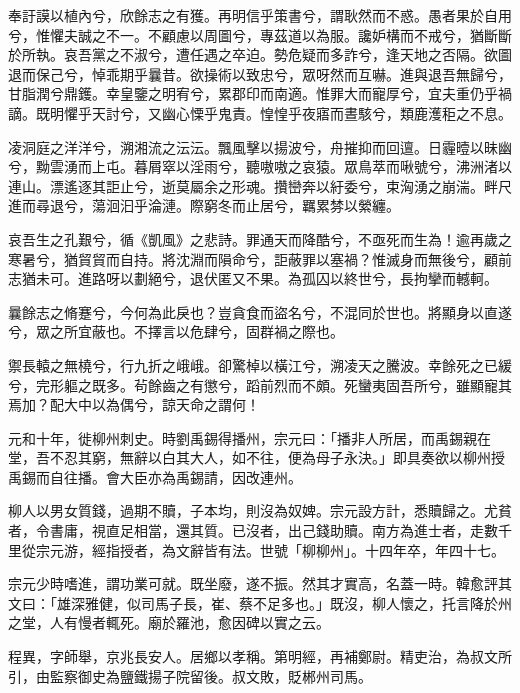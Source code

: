 \begin{pinyinscope}
 奉訏謨以植內兮，欣餘志之有獲。再明信乎策書兮，謂耿然而不惑。愚者果於自用兮，惟懼夫誠之不一。不顧慮以周圖兮，專茲道以為服。讒妒構而不戒兮，猶斷斷於所執。哀吾黨之不淑兮，遭任遇之卒迫。勢危疑而多詐兮，逢天地之否隔。欲圖退而保己兮，悼乖期乎曩昔。欲操術以致忠兮，眾呀然而互嚇。進與退吾無歸兮，甘脂潤兮鼎鑊。幸皇鑒之明宥兮，累郡印而南適。惟罪大而寵厚兮，宜夫重仍乎禍謫。既明懼乎天討兮，又幽心慄乎鬼責。惶惶乎夜寤而晝駭兮，類鹿濩秬之不息。



 凌洞庭之洋洋兮，溯湘流之沄沄。飄風擊以揚波兮，舟摧抑而回邅。日霾曀以昧幽兮，黝雲湧而上屯。暮屑窣以淫雨兮，聽嗷嗷之哀猿。眾鳥萃而啾號兮，沸洲渚以連山。漂遙逐其詎止兮，逝莫屬余之形魂。攢巒奔以紆委兮，束洶湧之崩湍。畔尺進而尋退兮，蕩洄汩乎淪漣。際窮冬而止居兮，羈累棼以縈纏。



 哀吾生之孔艱兮，循《凱風》之悲詩。罪通天而降酷兮，不亟死而生為！逾再歲之寒暑兮，猶貿貿而自持。將沈淵而隕命兮，詎蔽罪以塞禍？惟滅身而無後兮，顧前志猶未可。進路呀以劃絕兮，退伏匿又不果。為孤囚以終世兮，長拘攣而轗軻。



 曩餘志之脩蹇兮，今何為此戾也？豈貪食而盜名兮，不混同於世也。將顯身以直遂兮，眾之所宜蔽也。不擇言以危肆兮，固群禍之際也。



 禦長轅之無橈兮，行九折之峨峨。卻驚棹以橫江兮，溯凌天之騰波。幸餘死之已緩兮，完形軀之既多。茍餘齒之有懲兮，蹈前烈而不頗。死蠻夷固吾所兮，雖顯寵其焉加？配大中以為偶兮，諒天命之謂何！



 元和十年，徙柳州刺史。時劉禹錫得播州，宗元曰：「播非人所居，而禹錫親在堂，吾不忍其窮，無辭以白其大人，如不往，便為母子永決。」即具奏欲以柳州授禹錫而自往播。會大臣亦為禹錫請，因改連州。



 柳人以男女質錢，過期不贖，子本均，則沒為奴婢。宗元設方計，悉贖歸之。尤貧者，令書庸，視直足相當，還其質。已沒者，出己錢助贖。南方為進士者，走數千里從宗元游，經指授者，為文辭皆有法。世號「柳柳州」。十四年卒，年四十七。



 宗元少時嗜進，謂功業可就。既坐廢，遂不振。然其才實高，名蓋一時。韓愈評其文曰：「雄深雅健，似司馬子長，崔、蔡不足多也。」既沒，柳人懷之，托言降於州之堂，人有慢者輒死。廟於羅池，愈因碑以實之云。



 程異，字師舉，京兆長安人。居鄉以孝稱。第明經，再補鄭尉。精吏治，為叔文所引，由監察御史為鹽鐵揚子院留後。叔文敗，貶郴州司馬。




\end{pinyinscope}
